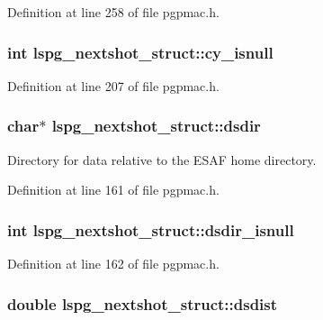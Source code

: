 Definition at line 258 of file pgpmac.h.\hypertarget{structlspg__nextshot__struct_a3895d645420848aed05b95694ec8c6c7}{
\subsubsection[{cy\_\-isnull}]{\setlength{\rightskip}{0pt plus 5cm}int {\bf lspg\_\-nextshot\_\-struct::cy\_\-isnull}}}
\label{structlspg__nextshot__struct_a3895d645420848aed05b95694ec8c6c7}


Definition at line 207 of file pgpmac.h.\hypertarget{structlspg__nextshot__struct_ac372e1774a25b3d4bfbb9169762eb39e}{
\subsubsection[{dsdir}]{\setlength{\rightskip}{0pt plus 5cm}char$\ast$ {\bf lspg\_\-nextshot\_\-struct::dsdir}}}
\label{structlspg__nextshot__struct_ac372e1774a25b3d4bfbb9169762eb39e}


Directory for data relative to the ESAF home directory. 

Definition at line 161 of file pgpmac.h.\hypertarget{structlspg__nextshot__struct_a8dea57b78b92d67d83ccbb6ed6da13ca}{
\subsubsection[{dsdir\_\-isnull}]{\setlength{\rightskip}{0pt plus 5cm}int {\bf lspg\_\-nextshot\_\-struct::dsdir\_\-isnull}}}
\label{structlspg__nextshot__struct_a8dea57b78b92d67d83ccbb6ed6da13ca}


Definition at line 162 of file pgpmac.h.\hypertarget{structlspg__nextshot__struct_acab9431a911f5bb11296cbfb271fb83a}{
\subsubsection[{dsdist}]{\setlength{\rightskip}{0pt plus 5cm}double {\bf lspg\_\-nextshot\_\-struct::dsdist}}}
\label{structlspg__nextshot__struct_acab9431a911f5bb11296cbfb271fb83a}


